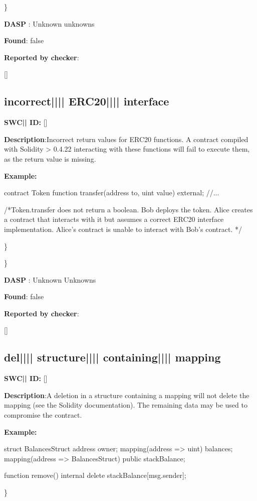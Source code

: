 \documentclass{article}
\begin{document}
\} 

\textbf{DASP} : Unknown unknowns

\textbf{Found}: false

\textbf{Reported by checker}: 
\begin{ffcode} 

[]
\end{ffcode} 
\subsection{incorrect{||\textunderscore|| }ERC20{||\textunderscore|| }interface} 
\textbf{SWC{|\textunderscore| }ID:} []

\textbf{Description}:Incorrect return values for ERC20 functions. A contract compiled with Solidity > 0.4.22 interacting with these functions will fail to execute them, as the return value is missing.


\textbf{Example:} 
\begin{ffcode} 

contract Token{
    function transfer(address to, uint value) external;
    //...
}

 /*Token.transfer does not return a boolean. Bob deploys the token. Alice creates a contract that interacts with it but assumes a correct ERC20 interface implementation. Alice's contract is unable to interact with Bob's contract. */ 

\end{ffcode} 
\} 

\} 

\textbf{DASP} : Unknown Unknowns

\textbf{Found}: false

\textbf{Reported by checker}: 
\begin{ffcode} 

[]
\end{ffcode} 
\subsection{del{||\textunderscore|| }structure{||\textunderscore|| }containing{||\textunderscore|| }mapping} 
\textbf{SWC{|\textunderscore| }ID:} []

\textbf{Description}:A deletion in a structure containing a mapping will not delete the mapping (see the Solidity documentation). The remaining data may be used to compromise the contract.


\textbf{Example:} 
\begin{ffcode} 

struct BalancesStruct{
    address owner;
    mapping(address => uint) balances;
}
mapping(address => BalancesStruct) public stackBalance;

function remove() internal{
      delete stackBalance[msg.sender];
}

\end{ffcode} 
\} 
\end{document}
